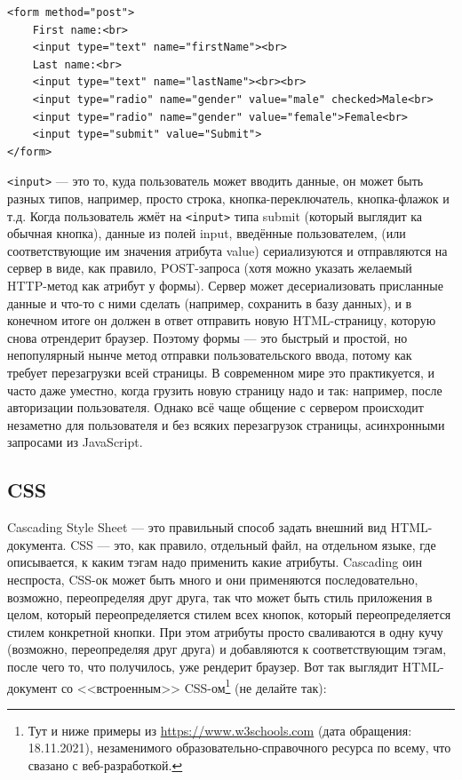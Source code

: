 \documentclass{../../text-style}
\begin{document}
\begin{verbatim}
<form method="post">
    First name:<br>
    <input type="text" name="firstName"><br>
    Last name:<br>
    <input type="text" name="lastName"><br><br>
    <input type="radio" name="gender" value="male" checked>Male<br>
    <input type="radio" name="gender" value="female">Female<br>
    <input type="submit" value="Submit">
</form>
\end{verbatim}

\texttt{<input>} --- это то, куда пользователь может вводить данные, он может быть разных типов, например, просто строка, кнопка-переключатель, кнопка-флажок и т.д. Когда пользователь жмёт на \texttt{<input>} типа submit (который выглядит ка обычная кнопка), данные из полей input, введённые пользователем, (или соответствующие им значения атрибута value) сериализуются и отправляются на сервер в виде, как правило, POST-запроса (хотя можно указать желаемый HTTP-метод как атрибут у формы). Сервер может десериализовать присланные данные и что-то с ними сделать (например, сохранить в базу данных), и в конечном итоге он должен в ответ отправить новую HTML-страницу, которую снова отрендерит браузер. Поэтому формы --- это быстрый и простой, но непопулярный нынче метод отправки пользовательского ввода, потому как требует перезагрузки всей страницы. В современном мире это практикуется, и часто даже уместно, когда грузить новую страницу надо и так: например, после авторизации пользователя. Однако всё чаще общение с сервером происходит незаметно для пользователя и без всяких перезагрузок страницы, асинхронными запросами из JavaScript.

\subsection{CSS}

Cascading Style Sheet --- это правильный способ задать внешний вид HTML-документа. CSS --- это, как правило, отдельный файл, на отдельном языке, где описывается, к каким тэгам надо применить какие атрибуты. Cascading оин неспроста, CSS-ок может быть много и они применяются последовательно, возможно, переопределяя друг друга, так что может быть стиль приложения в целом, который переопределяется стилем всех кнопок, который переопределяется стилем конкретной кнопки. При этом атрибуты просто сваливаются в одну кучу (возможно, переопределяя друг друга) и добавляются к соответствующим тэгам, после чего то, что получилось, уже рендерит браузер. Вот так выглядит HTML-документ со <<встроенным>> CSS-ом\footnote{Тут и ниже примеры из \url{https://www.w3schools.com} (дата обращения: 18.11.2021), незаменимого образовательно-справочного ресурса по всему, что свазано с веб-разработкой.} (не делайте так):
\end{document}
